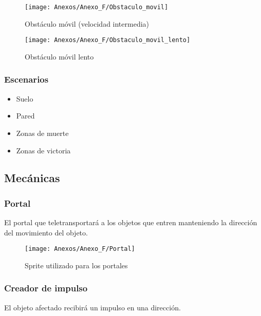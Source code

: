 \begin{figure}[h]
\centering
\texttt{[image: Anexos/Anexo\_F/Obstaculo\_movil]}
\caption{Obstáculo móvil (velocidad intermedia)}
\end{figure}

\begin{figure}[h]
\centering
\texttt{[image: Anexos/Anexo\_F/Obstaculo\_movil\_lento]}
\caption{Obstáculo móvil lento}
\raggedright
\end{figure}
\clearpage

\subsubsection{Escenarios}
\begin{itemize}
\item
Suelo
\item
Pared
\item
Zonas de muerte
\item
Zonas de victoria
\end{itemize}

\subsection{Mecánicas}
\subsubsection{Portal}
El portal \footnotemark que teletransportará a los objetos que entren manteniendo la dirección del movimiento del objeto.
\begin{figure}[h]
\centering
\texttt{[image: Anexos/Anexo\_F/Portal]}
\caption{Sprite utilizado para los portales}
\end{figure}

\subsubsection{Creador de impulso}
El objeto afectado recibirá un impulso en una dirección.


